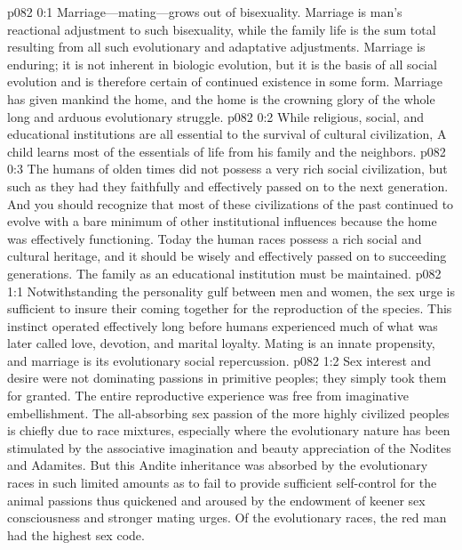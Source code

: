 \author{Chief of Seraphim}
\vs p082 0:1 Marriage---mating---grows out of bisexuality. Marriage is man’s reactional adjustment to such bisexuality, while the family life is the sum total resulting from all such evolutionary and adaptative adjustments. Marriage is enduring; it is not inherent in biologic evolution, but it is the basis of all social evolution and is therefore certain of continued existence in some form. Marriage has given mankind the home, and the home is the crowning glory of the whole long and arduous evolutionary struggle.
\vs p082 0:2 While religious, social, and educational institutions are all essential to the survival of cultural civilization,  A child learns most of the essentials of life from his family and the neighbors.
\vs p082 0:3 The humans of olden times did not possess a very rich social civilization, but such as they had they faithfully and effectively passed on to the next generation. And you should recognize that most of these civilizations of the past continued to evolve with a bare minimum of other institutional influences because the home was effectively functioning. Today the human races possess a rich social and cultural heritage, and it should be wisely and effectively passed on to succeeding generations. The family as an educational institution must be maintained.
\vs p082 1:1 Notwithstanding the personality gulf between men and women, the sex urge is sufficient to insure their coming together for the reproduction of the species. This instinct operated effectively long before humans experienced much of what was later called love, devotion, and marital loyalty. Mating is an innate propensity, and marriage is its evolutionary social repercussion.
\vs p082 1:2 Sex interest and desire were not dominating passions in primitive peoples; they simply took them for granted. The entire reproductive experience was free from imaginative embellishment. The all\hyp{}absorbing sex passion of the more highly civilized peoples is chiefly due to race mixtures, especially where the evolutionary nature has been stimulated by the associative imagination and beauty appreciation of the Nodites and Adamites. But this Andite inheritance was absorbed by the evolutionary races in such limited amounts as to fail to provide sufficient self\hyp{}control for the animal passions thus quickened and aroused by the endowment of keener sex consciousness and stronger mating urges. Of the evolutionary races, the red man had the highest sex code.
